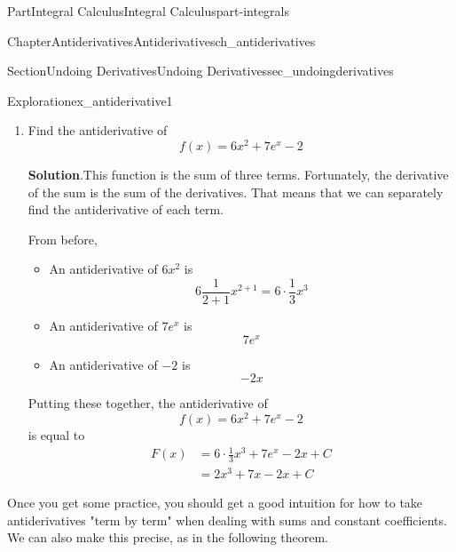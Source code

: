 \documentclass[oneside,10pt,]{tufte-book}
\newcommand{\blocktitlefont}{\relax}
\numberwithin{equation}{chapter}
\newcommand{\amp}{&}
\begin{document}
\begin{partptx}{Part}{Integral Calculus}{}{Integral Calculus}{}{}{part-integrals}
\begin{chapterptx}{Chapter}{Antiderivatives}{}{Antiderivatives}{}{}{ch_antiderivatives}
\begin{sectionptx}{Section}{Undoing Derivatives}{}{Undoing Derivatives}{}{}{sec_undoingderivatives}
\begin{exploration}{Exploration}{}{ex_antiderivative1}
\begin{enumerate}[font=\bfseries,label=(\alph*),ref=\alph*]
\begin{enumerate}
\item{}Multiply the antiderivative of \(\frac{1}{x}\) by 7%
\item{}Add \(+C\) to get \emph{the} antiderivative.%
\end{enumerate}
%
\par
This means that if \(f(x) = 7\frac{1}{x} \), the antiderivative is%
\begin{equation*}
F(x) = 7\cdot \Big( \ln(|x|) \Big) + C
\end{equation*}
%
\item{}Find the antiderivative of%
\begin{equation*}
f(x) = 6x^2 + 7e^x - 2
\end{equation*}
%
\par\smallskip%
\noindent\textbf{\blocktitlefont Solution}.\hypertarget{ex_antiderivative1-3-2}{}\quad{}This function is the sum of three terms. Fortunately, the derivative of the sum is the sum of the derivatives. That means that we can separately find the antiderivative of each term.%
\par
From before,%
\begin{itemize}[label=\textbullet]
\item{}An antiderivative of \(6x^2\) is%
\begin{equation*}
6\frac{1}{2+1}x^{2+1} = 6\cdot \frac{1}{3} x^3
\end{equation*}
%
\item{}An antiderivative of \(7e^x\) is%
\begin{equation*}
7e^x
\end{equation*}
%
\item{}An antiderivative of \(-2\) is%
\begin{equation*}
-2x
\end{equation*}
%
\end{itemize}
%
\par
Putting these together, the antiderivative of%
\begin{equation*}
f(x) = 6x^2 + 7e^x - 2 
\end{equation*}
is equal to%
\begin{align*}
F(x) \amp = 6\cdot\frac{1}{3} x^3 + 7 e^x -2x + C\\
\amp = 2x^3 + 7x -2x + C
\end{align*}
%
\end{enumerate}%
\end{exploration}%
Once you get some practice, you should get a good intuition for how to take antiderivatives "term by term" when dealing with sums and constant coefficients. We can also make this precise, as in the following theorem.%

\end{sectionptx}
\end{chapterptx}
\end{partptx}
\end{document}
